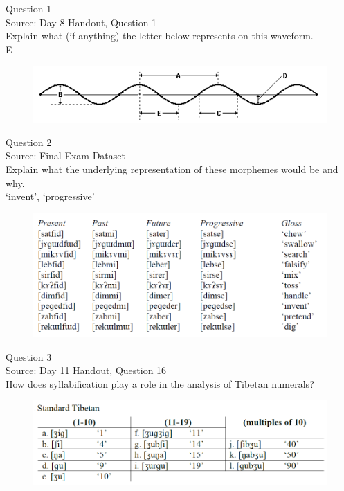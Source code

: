 \documentclass[12pt]{article}
\begin{document}
{\large Question 1}\\

Source: Day 8 Handout, Question 1\\

Explain what (if anything) the letter below represents on this waveform.\\

E

\begin{figure}[H]
\includegraphics{../images/sinusoid.png}
\end{figure}

\newpage

{\large Question 2}\\

Source: Final Exam Dataset\\

Explain what the underlying representation of these morphemes would be and why.\\

`invent', `progressive'

\begin{figure}[H]
\includegraphics{../images/final_dataset.png}
\end{figure}

\newpage

{\large Question 3}\\

Source: Day 11 Handout, Question 16\\

How does syllabification play a role in the analysis of Tibetan numerals?\\

\begin{figure}[H]
\includegraphics{../images/tibetan.png}
\end{figure}
\end{document}
